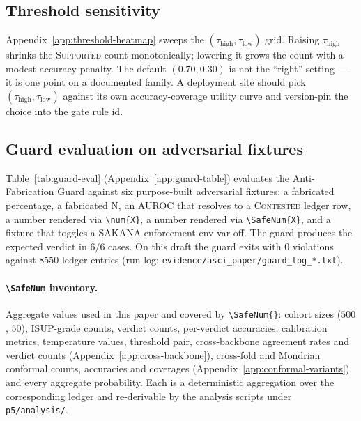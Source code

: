 \documentclass{article}
\newcommand{\SafeNum}[1]{#1}
\begin{document}
\subsection{Threshold sensitivity}
\label{sec:threshold-sens}

Appendix~\ref{app:threshold-heatmap} sweeps the $(\tau_{\text{high}}, \tau_{\text{low}})$ grid. Raising $\tau_{\text{high}}$ shrinks the \textsc{Supported} count monotonically; lowering it grows the count with a modest accuracy penalty. The default $(\SafeNum{0.70}, \SafeNum{0.30})$ is not the ``right'' setting --- it is one point on a documented family. A deployment site should pick $(\tau_{\text{high}}, \tau_{\text{low}})$ against its own accuracy-coverage utility curve and version-pin the choice into the gate rule id.

\subsection{Guard evaluation on adversarial fixtures}
\label{sec:guard-eval}

Table~\ref{tab:guard-eval} (Appendix~\ref{app:guard-table}) evaluates the Anti-Fabrication Guard against six purpose-built adversarial fixtures: a fabricated percentage, a fabricated N, an AUROC that resolves to a \textsc{Contested} ledger row, a number rendered via \texttt{\textbackslash num\{X\}}, a number rendered via \texttt{\textbackslash SafeNum\{X\}}, and a fixture that toggles a SAKANA enforcement env var off. The guard produces the expected verdict in $\SafeNum{6}/\SafeNum{6}$ cases. On this draft the guard exits with $\SafeNum{0}$ violations against $\SafeNum{8550}$ ledger entries (run log: \texttt{evidence/asci\_paper/guard\_log\_*.txt}).


\paragraph{\texttt{\textbackslash SafeNum} inventory.} Aggregate values used in this paper and covered by \texttt{\textbackslash SafeNum\{\}}: cohort sizes ($\SafeNum{500}$, $\SafeNum{50}$), ISUP-grade counts, verdict counts, per-verdict accuracies, calibration metrics, temperature values, threshold pair, cross-backbone agreement rates and verdict counts (Appendix~\ref{app:cross-backbone}), cross-fold and Mondrian conformal counts, accuracies and coverages (Appendix~\ref{app:conformal-variants}), and every aggregate probability. Each is a deterministic aggregation over the corresponding ledger and re-derivable by the analysis scripts under \texttt{p5/analysis/}.
\end{document}
